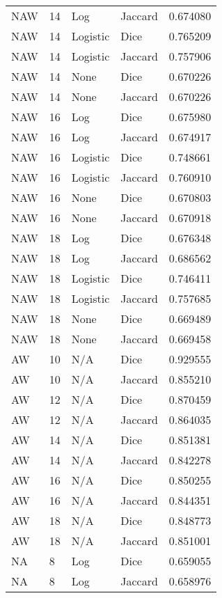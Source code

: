 \documentclass{article}
\begin{document}
\begin{center}
\begin{supertabular}{| l | l | l | l | l |}
            NAW & 14 & Log & Jaccard & 0.674080 \\
            NAW & 14 & Logistic & Dice & 0.765209 \\
            NAW & 14 & Logistic & Jaccard & 0.757906 \\
            NAW & 14 & None & Dice & 0.670226 \\
            NAW & 14 & None & Jaccard & 0.670226 \\
            NAW & 16 & Log & Dice & 0.675980 \\
            NAW & 16 & Log & Jaccard & 0.674917 \\
            NAW & 16 & Logistic & Dice & 0.748661 \\
            NAW & 16 & Logistic & Jaccard & 0.760910 \\
            NAW & 16 & None & Dice & 0.670803 \\
            NAW & 16 & None & Jaccard & 0.670918 \\
            NAW & 18 & Log & Dice & 0.676348 \\
            NAW & 18 & Log & Jaccard & 0.686562 \\
            NAW & 18 & Logistic & Dice & 0.746411 \\
            NAW & 18 & Logistic & Jaccard & 0.757685 \\
            NAW & 18 & None & Dice & 0.669489 \\
            NAW & 18 & None & Jaccard & 0.669458 \\
            AW & 10 & N/A & Dice & 0.929555 \\
            AW & 10 & N/A & Jaccard & 0.855210 \\
            AW & 12 & N/A & Dice & 0.870459 \\
            AW & 12 & N/A & Jaccard & 0.864035 \\
            AW & 14 & N/A & Dice & 0.851381 \\
            AW & 14 & N/A & Jaccard & 0.842278 \\
            AW & 16 & N/A & Dice & 0.850255 \\
            AW & 16 & N/A & Jaccard & 0.844351 \\
            AW & 18 & N/A & Dice & 0.848773 \\
            AW & 18 & N/A & Jaccard & 0.851001 \\
            NA & 8 & Log & Dice & 0.659055 \\
            NA & 8 & Log & Jaccard & 0.658976 \\

\end{supertabular}
\end{center}
\end{document}
